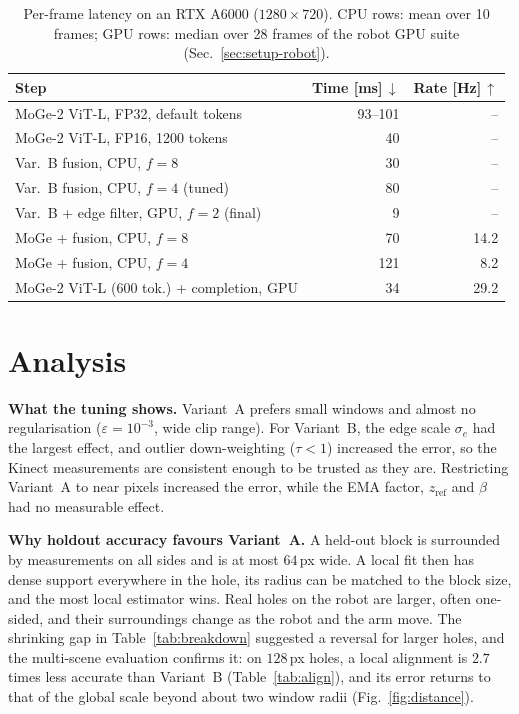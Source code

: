 \documentclass[conference]{IEEEtran}
\begin{document}
\begin{table}[t]
\centering
\caption{Per-frame latency on an RTX A6000 (\(1280{\times}720\)). CPU rows:
mean over 10 frames; GPU rows: median over 28 frames of the robot GPU suite
(Sec.~\ref{sec:setup-robot}).}
\label{tab:runtime}
\footnotesize
\begin{tabular}{@{}lrr@{}}
\toprule
Step & Time [ms]\,\(\downarrow\) & Rate [Hz]\,\(\uparrow\) \\
\midrule
MoGe-2 ViT-L, FP32, default tokens & 93--101 & -- \\
MoGe-2 ViT-L, FP16, 1200 tokens    & 40 & -- \\
Var.~B fusion, CPU, \(f=8\)         & 30 & -- \\
Var.~B fusion, CPU, \(f=4\) (tuned) & 80 & -- \\
Var.~B + edge filter, GPU, \(f=2\) (final) & 9 & -- \\
\midrule
MoGe + fusion, CPU, \(f=8\)         & 70 & 14.2 \\
MoGe + fusion, CPU, \(f=4\)         & 121 & 8.2 \\
MoGe-2 ViT-L (600 tok.) + completion, GPU & 34 & 29.2 \\
\bottomrule
\end{tabular}
\end{table}

\section{Analysis}
\label{sec:analysis}

\textbf{What the tuning shows.} Variant~A prefers small windows and almost no
regularisation (\(\varepsilon=10^{-3}\), wide clip range). For Variant~B, the
edge scale \(\sigma_e\) had the largest effect, and outlier down-weighting
(\(\tau<1\)) increased the error, so the Kinect measurements are consistent
enough to be trusted as they are. Restricting Variant~A to near pixels
increased the error, while the EMA factor, \(z_{\mathrm{ref}}\) and
\(\beta\) had no measurable effect.

\textbf{Why holdout accuracy favours Variant~A.} A held-out block is
surrounded by measurements on all sides and is at most \(64\,\)px wide. A local
fit then has dense support everywhere in the hole, its radius can be matched to
the block size, and the most local estimator wins. Real holes on the robot are
larger, often one-sided, and their surroundings change as the robot and the
arm move. The shrinking gap in Table~\ref{tab:breakdown} suggested a reversal
for larger holes, and the multi-scene evaluation confirms it: on \(128\,\)px
holes, a local alignment is \(2.7\) times less accurate than Variant~B
(Table~\ref{tab:align}), and its error returns to that of the global scale
beyond about two window radii (Fig.~\ref{fig:distance}).
\end{document}
